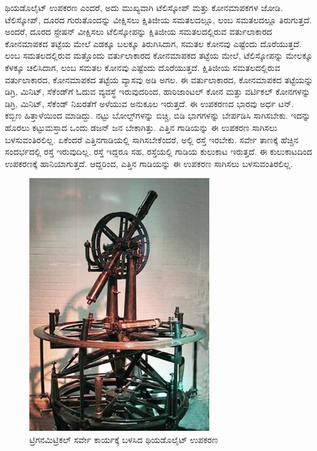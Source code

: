 ಥಿಯಡೊಲೈಟ್​ ಉಪಕರಣ ಎಂದರೆ, ಅದು ಮುಖ್ಯವಾಗಿ ಟೆಲಿಸ್ಕೋಪ್​ ಮತ್ತು ಕೋನಮಾಪಕಗಳ ಜೋಡಿ. ಟೆಲಿಸ್ಕೋಪ್​, ದೂರದ ಗುರುತೊಂದನ್ನು ವೀಕ್ಷಿಸಲು ಕ್ಷಿತಿಜೀಯ ಸಮತಲದಲ್ಲೂ, ಲಂಬ ಸಮತಲದಲ್ಲೂ ತಿರುಗುತ್ತದೆ. ಅಂದರೆ, ದೂರದ ಸ್ಟೇಷನ್​ ವೀಕ್ಷಿಸಲು ಟೆಲಿಸ್ಕೋಪನ್ನು ಕ್ಷಿತಿಜೀಯ ಸಮತಲದಲ್ಲಿರುವ ವರ್ತುಲಾಕಾರದ ಕೋನಮಾಪಕದ ತಟ್ಟೆಯ ಮೇಲೆ ಎಡಕ್ಕೂ ಬಲಕ್ಕೂ ತಿರುಗಿಸಿದಾಗ, ಸಮತಲ ಕೋನವು ಎಷ್ಟೆಂದು ದೊರೆಯುತ್ತದೆ. ಲಂಬ ಸಮತಲದಲ್ಲಿರುವ ಮತ್ತೊಂದು ವರ್ತುಲಾಕಾರದ ಕೋನಮಾಪಕದ ತಟ್ಟೆಯ ಮೇಲೆ, ಟೆಲಿಸ್ಕೋಪನ್ನು ಮೇಲಕ್ಕೂ ಕೆಳಕ್ಕೂ ಚಲಿಸಿದಾಗ, ಲಂಬ ಸಮತಲ ಕೋನವು ಎಷ್ಟೆಂದು ದೊರೆಯುತ್ತದೆ. ಕ್ಷಿತಿಜೀಯ ಸಮತಲದಲ್ಲಿರುವ ವರ್ತುಲಾಕಾರದ, ಕೋನಮಾಪಕದ ತಟ್ಟೆಯ ವ್ಯಾಸವು  ಅಡಿ ಅಗಲ. ಈ ವರ್ತುಲಾಕಾರದ, ಕೋನಮಾಪಕದ ತಟ್ಟೆಯನ್ನು ಡಿಗ್ರಿ, ಮಿನಿಟ್​, ಸೆಕೆಂಡ್​ಗೆ ಓದುವ ವ್ಯವಸ್ಥೆ ಇರುವುದರಿಂದ, ಹಾರಿಜಾಂಟಲ್​ ಕೋನ ಮತ್ತು ವರ್ಟಿಕಲ್​ ಕೋನಗಳನ್ನು ಡಿಗ್ರಿ, ಮಿನಿಟ್​, ಸೆಕೆಂಡ್​ ನಿಖರತೆಗೆ ಅಳೆಯುವ ಅನುಕೂಲ ಇರುತ್ತದೆ. ಈ ಉಪಕರಣದ ಭಾರವು ಅರ್ಧ ಟನ್​. ಕಬ್ಬಿಣ ಹಿತ್ತಾಳೆಯಿಂದ ಮಾಡಿದ್ದು. ನಟ್ಟು ಬೋಲ್ಟ್​ಗಳನ್ನು ಬಿಚ್ಚಿ, ಬಿಡಿ ಭಾಗಗಳನ್ನು ಬೇರ್ಪಡಿಸಿ ಸಾಗಿಸಬೇಕು. ಇದನ್ನು ಹೊರಲು ಕಟ್ಟುಮಸ್ತಾದ ಒಂದು ಡಜನ್​ ಜನ ಬೇಕಾಗಿತ್ತು. ಎತ್ತಿನ ಗಾಡಿಯನ್ನು ಈ ಉಪಕರಣ ಸಾಗಿಸಲು ಬಳಸುವಂತಿರಲಿಲ್ಲ. ಏಕೆಂದರೆ ಎತ್ತಿನಗಾಡಿಯಲ್ಲಿ ಸಾಗಿಸಬೇಕೆಂದರೆ, ಅಲ್ಲಿ ರಸ್ತೆ ಇರಬೇಕು. ಸರ್ವೇ ತಾಣಕ್ಕೆ ಹೆಚ್ಚಿನ ಸಂದರ್ಭದಲ್ಲಿ ರಸ್ತೆ ಇರುವುದಿಲ್ಲ. ರಸ್ತೆ ಇದ್ದರೂ ಸಹ, ರಸ್ತೆಯಲ್ಲಿ ಗಾಡಿಯ ಕುಲುಕಾಟ ಇರುತ್ತದೆ. ಈ ಕುಲುಕಾಟದಿಂದ ಉಪಕರಣಕ್ಕೆ ಹಾನಿಯಾಗುತ್ತದೆ. ಆದ್ದರಿಂದ, ಎತ್ತಿನ ಗಾಡಿಯನ್ನು ಈ ಉಪಕರಣ ಸಾಗಿಸಲು ಬಳಸುವಂತಿರಲಿಲ್ಲ.

\begin{figure}[!htbp]
\includegraphics[scale=0.6]{"images/image007.jpg"}
\caption{ಟ್ರಿಗನಮಿಟ್ರಿಕಲ್​ ಸರ್ವೇ ಕಾರ್ಯಕ್ಕೆ ಬಳಸಿದ ಥಿಯಡೊಲೈಟ್​ ಉಪಕರಣ}\label{art5-fig1}
\end{figure}

